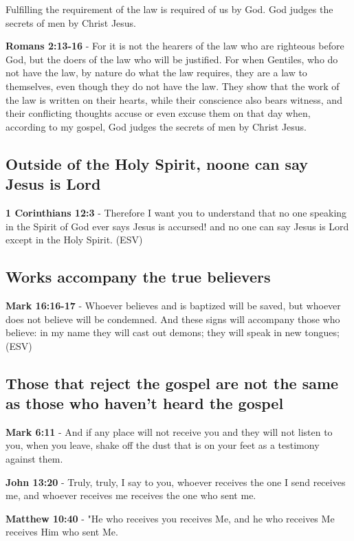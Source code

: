 \documentclass[11pt]{article}
\begin{document}
Fulfilling the requirement of the law is required of us by God. God judges the secrets of men by Christ Jesus.

\textbf{Romans 2:13-16} - For it is not the hearers of the law who are righteous before God, but the doers of the law who will be justified.  For when Gentiles, who do not have the law, by nature do what the law requires, they are a law to themselves, even though they do not have the law.  They show that the work of the law is written on their hearts, while their conscience also bears witness, and their conflicting thoughts accuse or even excuse them on that day when, according to my gospel, God judges the secrets of men by Christ Jesus.

\subsection{Outside of the Holy Spirit, noone can say Jesus is Lord}
\label{sec:org5994be5}

\textbf{1 Corinthians 12:3} - Therefore I want you to understand that no one speaking in the Spirit of God ever says Jesus is accursed! and no one can say Jesus is Lord except in the Holy Spirit. (ESV)

\subsection{Works accompany the true believers}
\label{sec:orgaf14bab}
\textbf{Mark 16:16-17} - Whoever believes and is baptized will be saved, but whoever does not believe will be condemned. And these signs will accompany those who believe: in my name they will cast out demons; they will speak in new tongues; (ESV)

\subsection{Those that reject the gospel are not the same as those who haven't heard the gospel}
\label{sec:orgee7ab84}
\textbf{Mark 6:11} - And if any place will not receive you and they will not listen to you, when you leave, shake off the dust that is on your feet as a testimony against them.

\textbf{John 13:20} - Truly, truly, I say to you, whoever receives the one I send receives me, and whoever receives me receives the one who sent me.

\textbf{Matthew 10:40} - "He who receives you receives Me, and he who receives Me receives Him who sent Me.
\end{document}
